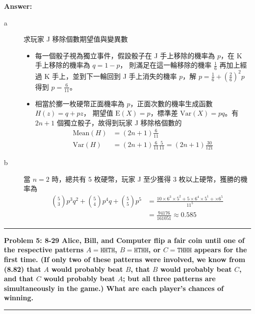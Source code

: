 \documentclass[11pt,fleqn]{article}
\newcommand\question[2]{\vspace{.25in}\hrule\textbf{#1: #2}\vspace{.5em}\hrule\vspace{.10in}}
\renewcommand\part[1]{\vspace{.10in}\textbf{#1}}
\begin{document}
\part{Answer:}

\begin{description}
	\item[a] 求玩家 J 移除個數期望值與變異數
		\begin{itemize}
			\item
			每一個骰子視為獨立事件，假設骰子在 J 手上移除的機率為 $p$，在 K 手上移除的機率為 $q = 1-p$，
			則滿足在這一輪移除的機率 
			$\frac{1}{6}$ 再加上經過 K 手上，並到下一輪回到 J 手上消失的機率 $p$，解
			$p = \frac{1}{6} + \left( \frac{2}{6}\right)^2 p$ 得到 $p = \frac{6}{11}$。
			\item 
			相當於擲一枚硬幣正面機率為 $p$，正面次數的機率生成函數 $H(z) = q + pz$，
			期望值 $\text{E}(X)=p$，標準差 $\text{Var}(X) = pq$。有 $2n+1$ 個獨立骰子，故得到玩家 J
			移除格個數的
				\begin{align*}
					\text{Mean}(H) &= (2n+1)\frac{6}{11} \\
					\text{Var}(H)&= (2n+1)\frac{6}{11}\frac{5}{11} = (2n+1)\frac{30}{121}
				\end{align*}
		\end{itemize}
	\item[b] 當 $n = 2$ 時，總共有 5 枚硬幣，玩家 J 至少獲得 3 枚以上硬幣，獲勝的機率為 
			\begin{align*}
				\binom{5}{3} p^3 q^2 + \binom{5}{4} p^4 q + \binom{5}{5} p^5 
					&= \frac{10 \times 6^3 \times 5^2 + 5 \times 6^4 \times 5^1 + 
						\times 6^5}{11^5} \\
					&= \frac{94176}{161051} \approx 0.585
			\end{align*}
\end{description}

\question{Problem 5}{8-29 Alice, Bill, and Computer flip a fair coin until one of the respective
	patterns $A = \texttt{HHTH}$, $B = \texttt{HTHH}$, or $C = \texttt{THHH}$ appears for
	the first time. (If only two of these patterns were involved, we know from (8.82) that
	$A$ would probably beat $B$, that $B$ would probably beat $C$, and that $C$ would
	probably beat $A$; but all three patterns are simultaneously in the game.) 
	What are each player's chances of winning.
}
\end{document}
